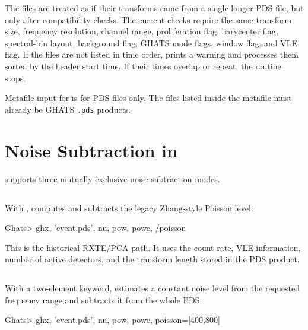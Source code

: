 The files are treated as if their transforms came from a single longer PDS
file, but only after compatibility checks.  The current checks require the
same transform size, frequency resolution, channel range, proliferation flag,
barycenter flag, spectral-bin layout, background flag, GHATS mode flags,
window flag, and VLE flag.  If the files are not listed in time order,
 prints a warning and processes them sorted by the header start
time.  If their times overlap or repeat, the routine stops.

\begin{ghatsnote}
Metafile input for  is for PDS files only.  The files listed
inside the metafile must already be GHATS \texttt{.pds} products.
\end{ghatsnote}

\section{Noise Subtraction in }

 supports three mutually exclusive noise-subtraction modes.

\subsection{}

With ,  computes and subtracts the legacy
Zhang-style Poisson level:

\begin{ghatsconsole}
Ghats> ghx, 'event.pds', nu, pow, powe, /poisson
\end{ghatsconsole}

This is the historical RXTE/PCA path.  It uses the count rate, VLE
information, number of active detectors, and the transform length stored in
the PDS product.

\subsection{}

With a two-element  keyword,  estimates a constant
noise level from the requested frequency range and subtracts it from the whole
PDS:

\begin{ghatsconsole}
Ghats> ghx, 'event.pds', nu, pow, powe, poisson=[400,800]
\end{ghatsconsole}

